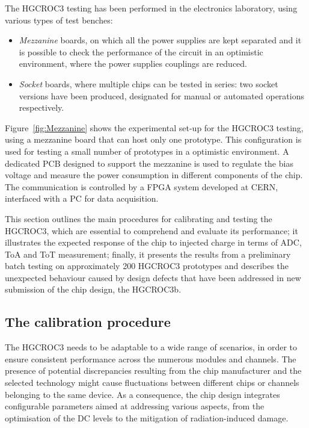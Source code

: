 The HGCROC3 testing has been performed in the electronics laboratory, using various types of test benches:
\begin{itemize}
    \item \textit{Mezzanine} boards, on which all the power supplies are kept separated and it is possible to check the performance of the circuit in an optimistic environment, where the power supplies couplings are reduced.
    \item \textit{Socket} boards, where multiple chips can be tested in series: two socket versions have been produced, designated for manual or automated operations respectively.
\end{itemize}

Figure~\ref{fig:Mezzanine} shows the experimental set-up for the HGCROC3 testing, using a mezzanine board that can host only one prototype. This configuration is used for testing a small number of prototypes in a optimistic environment. A dedicated PCB designed to support the mezzanine is used to regulate the bias voltage and measure the power consumption in different components of the chip. The communication is controlled by a FPGA system developed at CERN, interfaced with a PC for data acquisition.

This section outlines the main procedures for calibrating and testing the HGCROC3, which are essential to comprehend and evaluate its performance; it illustrates the expected response of the chip to injected charge in terms of ADC, ToA and ToT measurement; finally, it presents the results from a preliminary batch testing on approximately 200 HGCROC3 prototypes and describes the unexpected behaviour caused by design defects that have been addressed in new submission of the chip design, the HGCROC3b.

\subsection{The calibration procedure}
\label{subsec:The calibration procedure}

The HGCROC3 needs to be adaptable to a wide range of scenarios, in order to ensure consistent performance across the numerous modules and channels. The presence of potential discrepancies resulting from the chip manufacturer and the selected technology might cause fluctuations between different chips or channels belonging to the same device. As a consequence, the chip design integrates configurable parameters aimed at addressing various aspects, from the optimisation of the DC levels to the mitigation of radiation-induced damage. 

